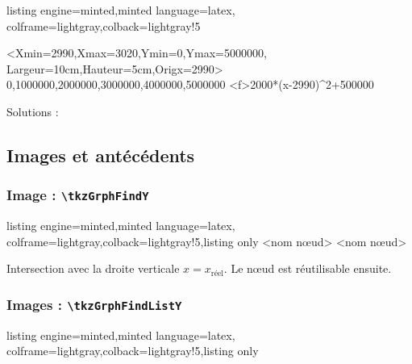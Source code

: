 \documentclass[11pt,a4paper]{ltxdoc}
\begin{document}
\begin{tcblisting}{listing engine=minted,minted language=latex,
  colframe=lightgray,colback=lightgray!5}
\begin{tkzGrph}<Xmin=2990,Xmax=3020,Ymin=0,Ymax=5000000,
               Largeur=10cm,Hauteur=5cm,Origx=2990>
    {0,1000000,2000000,3000000,4000000,5000000}
  \tkzGrphDefineCurve[name=cf]<f>{2000*(x-2990)^2+500000}
\end{tkzGrph}

Solutions : \LISTRES
\end{tcblisting}

\pagebreak

\subsection{Images et antécédents}

\subsubsection{Image : \texttt{\textbackslash tkzGrphFindY}}

\begin{tcblisting}{listing engine=minted,minted language=latex,
  colframe=lightgray,colback=lightgray!5,listing only}
<nom nœud>
<nom nœud>
\end{tcblisting}

Intersection avec la droite verticale $x = x_{\text{réel}}$. Le nœud  est réutilisable ensuite.

\subsubsection{Images : \texttt{\textbackslash tkzGrphFindListY}}

\begin{tcblisting}{listing engine=minted,minted language=latex,
  colframe=lightgray,colback=lightgray!5,listing only}
\end{tcblisting}
\end{document}
